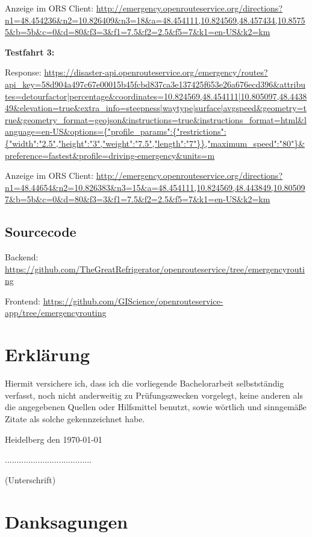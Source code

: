 Anzeige im ORS Client:
\url{http://emergency.openrouteservice.org/directions?n1=48.454236&n2=10.826409&n3=18&a=48.454111,10.824569,48.457434,10.85755&b=5b&c=0&d=80&f3=3&f1=7.5&f2=2.5&f5=7&k1=en-US&k2=km}

\textbf{Testfahrt 3:}

Response:
\url{https://disaster-api.openrouteservice.org/emergency/routes?api_key=58d904a497c67e00015b45fcbd837ca3e137425f653e26a676ecd396&attributes=detourfactor|percentage&coordinates=10.824569,48.454111|10.805097,48.443849&elevation=true&extra_info=steepness|waytype|surface|avgspeed&geometry=true&geometry_format=geojson&instructions=true&instructions_format=html&language=en-US&options={"profile_params":{"restrictions":{"width":"2.5","height":"3","weight":"7.5","length":"7"}},"maximum_speed":"80"}&preference=fastest&profile=driving-emergency&units=m}

Anzeige im ORS Client:
\url{http://emergency.openrouteservice.org/directions?n1=48.44654&n2=10.826383&n3=15&a=48.454111,10.824569,48.443849,10.805097&b=5b&c=0&d=80&f3=3&f1=7.5&f2=2.5&f5=7&k1=en-US&k2=km}

\subsection*{Sourcecode}

Backend:
\url{https://github.com/TheGreatRefrigerator/openrouteservice/tree/emergencyrouting}


Frontend:
\url{https://github.com/GIScience/openrouteservice-app/tree/emergencyrouting}

\newpage
\section*{Erklärung}
\vspace{1cm}
Hiermit versichere ich, dass ich die vorliegende Bachelorarbeit selbstständig verfasst, noch nicht anderweitig zu Prüfungszwecken vorgelegt, keine anderen als die angegebenen Quellen oder Hilfsmittel benutzt, sowie wörtlich und sinngemäße Zitate als solche gekennzeichnet habe.\par
\bigskip

{\flushleft Heidelberg den \today } {\hfill .....................................\par}
{\hfill (Unterschrift)}

\newpage
\section*{Danksagungen}

